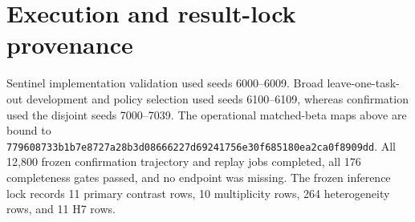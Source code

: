 \documentclass[10pt]{article}
\begin{document}
\section{Execution and result-lock provenance}\label{sec:supp-v6-locks}
Sentinel implementation validation used seeds 6000--6009. Broad
leave-one-task-out development and policy selection used seeds 6100--6109,
whereas confirmation used the disjoint seeds 7000--7039. The operational
matched-beta maps above are bound to
\texttt{779608733b1b7e8727a28b3d08666227d69241756e30f685180ea2ca0f8909dd}.
All 12,800 frozen confirmation trajectory and replay jobs completed, all 176 completeness gates
passed, and no endpoint was missing. The frozen inference lock records 11
primary contrast rows, 10 multiplicity rows, 264 heterogeneity rows, and 11 H7
rows.


\begingroup\scriptsize
\end{document}
